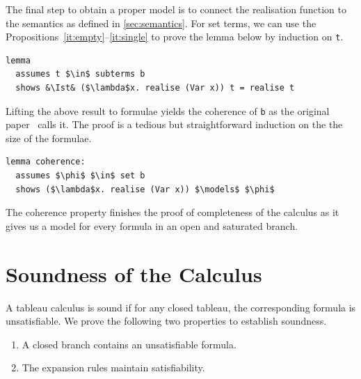 \documentclass[
  sigplan,
  10pt,
  ]{acmart}
\newcommand{\Ist}{I$_\text{st}$}
\begin{document}
\noindent The final step to obtain a proper model is to connect the realisation function to the semantics as defined in \autoref{sec:semantics}.
For set terms, we can use the Propositions~\ref{it:empty}--\ref{it:single} to prove the lemma below by induction on \lstinline!t!.
\begin{lstlisting}
lemma
  assumes t $\in$ subterms b
  shows &\Ist& ($\lambda$x. realise (Var x)) t = realise t
\end{lstlisting}
Lifting the above result to formulae yields the coherence of \lstinline!b! as the original paper~\cite{new_fast_tableau} calls it.
The proof is a tedious but straightforward induction on the the size of the formulae.
\begin{lstlisting}[label={lst:coherence}]
lemma coherence:
  assumes $\phi$ $\in$ set b
  shows ($\lambda$x. realise (Var x)) $\models$ $\phi$
\end{lstlisting}
The coherence property finishes the proof of completeness of the calculus as it gives us a model for every formula in an open and saturated branch.

\section{Soundness of the Calculus\label{sec:sound}}
A tableau calculus is sound if for any closed tableau, the corresponding formula is unsatisfiable. 
We prove the following two properties to establish soundness.
\begin{enumerate}[label={(\roman*)}]
  \item A closed branch contains an unsatisfiable formula.
  \item The expansion rules maintain satisfiability.
\end{enumerate}
\end{document}
